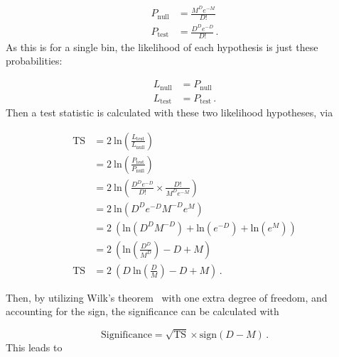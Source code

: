 \begin{equation}\label{eqn:sig_hypo}
  \begin{split}
    P_{\textrm{null}} & = \frac{M^{D} e^{-M}}{D!} \\
    P_{\textrm{test}} & = \frac{D^{D} e^{-D}}{D!} \,.
  \end{split}
\end{equation}
As this is for a single bin, the likelihood of each hypothesis is just these probabilities:
  
\begin{equation}
  \begin{split}
    L_{\textrm{null}} & = P_{\textrm{null}} \\
    L_{\textrm{test}} & = P_{\textrm{test}} \,.
  \end{split}
\end{equation}
Then a test statistic is calculated with these two likelihood hypotheses, via

\begin{equation}
  \begin{split}
    \textrm{TS} & = 2 \: \textrm{ln} \left ( \frac{ L_{\textrm{test}} }{ L_{\textrm{null}}    } \right ) \\
                & = 2 \: \textrm{ln} \left ( \frac{ P_{\textrm{test}} }{ P_{\textrm{null}}    } \right ) \\
                & = 2 \: \textrm{ln} \left ( \frac{D^D e^{-D}}{D!} \times \frac{D!}{M^D e^{-M}} \right ) \\
                & = 2 \: \textrm{ln} \left ( D^D e^{-D} M^{-D} e^M                              \right ) \\
                & = 2 \: \left (      \textrm{ln} \left ( D^D M^{-D} \right ) + \textrm{ln} \left ( e^{-D} \right ) + \textrm{ln} \left ( e^M  \right )\right ) \\
                & = 2 \: \left (      \textrm{ln} \left (  \frac{D^D}{M^D} \right ) -D + M \right ) \\
    \textrm{TS} & = 2 \: \left ( D \: \textrm{ln} \left (  \frac{D  }{M  } \right ) -D + M \right ) \,.
  \end{split}
\end{equation}
  
Then, by utilizing Wilk's theorem~\cite{wilks1938} with one extra degree of freedom, and accounting for the sign, the significance can be calculated with
  
\begin{equation}
  \textrm{Significance} = \sqrt{\textrm{TS}} \times \textrm{sign} \left ( D - M \right ) \,.
\end{equation}
This leads to

